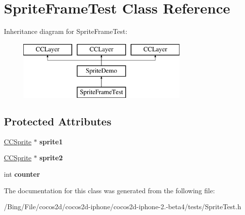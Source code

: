 \hypertarget{interface_sprite_frame_test}{\section{Sprite\-Frame\-Test Class Reference}
\label{interface_sprite_frame_test}
}
Inheritance diagram for Sprite\-Frame\-Test\-:\begin{figure}[H]
\begin{center}
\leavevmode
\includegraphics[height=3.000000cm]{interface_sprite_frame_test}
\end{center}
\end{figure}
\subsection*{Protected Attributes}
\begin{DoxyCompactItemize}
\item 
\hypertarget{interface_sprite_frame_test_aea55a1949b8610909c7ec07865c7367a}{\hyperlink{class_c_c_sprite}{C\-C\-Sprite} $\ast$ {\bfseries sprite1}}\label{interface_sprite_frame_test_aea55a1949b8610909c7ec07865c7367a}

\item 
\hypertarget{interface_sprite_frame_test_a037eae4ccf6b6766dab940a16958e740}{\hyperlink{class_c_c_sprite}{C\-C\-Sprite} $\ast$ {\bfseries sprite2}}\label{interface_sprite_frame_test_a037eae4ccf6b6766dab940a16958e740}

\item 
\hypertarget{interface_sprite_frame_test_a8d12a732ed46a725173c0dc0d44c9455}{int {\bfseries counter}}\label{interface_sprite_frame_test_a8d12a732ed46a725173c0dc0d44c9455}

\end{DoxyCompactItemize}


The documentation for this class was generated from the following file\-:\begin{DoxyCompactItemize}
\item 
/\-Bing/\-File/cocos2d/cocos2d-\/iphone/cocos2d-\/iphone-\/2.-\/beta4/tests/Sprite\-Test.\-h\end{DoxyCompactItemize}
